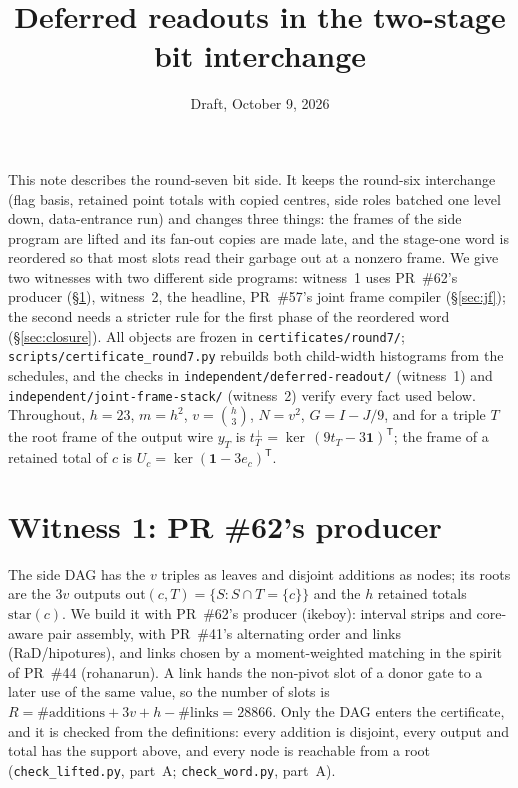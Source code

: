 \documentclass[11pt]{article}
\title{Deferred readouts in the two-stage bit interchange}
\date{Draft, October 9, 2026}
\theoremstyle{remark}\newtheorem*{remark}{Remark}
\begin{document}
\sloppy
\maketitle

This note describes the round-seven bit side. It keeps the round-six interchange (flag basis, retained point totals
with copied centres, side roles batched one level down, data-entrance run) and changes three things: the frames of
the side program are lifted and its fan-out copies are made late, and the stage-one word is reordered so that most
slots read their garbage out at a nonzero frame. We give two witnesses with two different side programs: witness~1
uses PR~\#62's producer (\S\ref{sec:pr62}), witness~2, the headline, PR~\#57's joint frame compiler
(\S\ref{sec:jf}); the second needs a stricter rule for the first phase of the reordered word (\S\ref{sec:closure}).
All objects are frozen in \texttt{certificates/round7/}; \texttt{scripts/certificate\_round7.py} rebuilds both
child-width histograms from the schedules, and the checks in \texttt{independent/deferred-readout/} (witness~1) and
\texttt{independent/joint-frame-stack/} (witness~2) verify every fact used below. Throughout, $h=23$,
$m=h^2$, $v=\binom h3$, $N=v^2$, $G=I-J/9$, and for a triple $T$ the root frame of the output wire $y_T$ is
$t_T^\perp=\ker\,(9t_T-3\mathbf 1)^{\mathsf T}$; the frame of a retained total of $c$ is $U_c=\ker(\mathbf 1-3e_c)^{\mathsf T}$.

\section{Witness 1: PR \#62's producer}\label{sec:pr62}
The side DAG has the $v$ triples as leaves and disjoint additions as nodes; its roots are the $3v$ outputs
$\mathrm{out}(c,T)=\{S: S\cap T=\{c\}\}$ and the $h$ retained totals $\mathrm{star}(c)$. We build it with PR~\#62's
producer (ikeboy): interval strips and core-aware pair assembly, with PR~\#41's alternating order and links
(RaD/hipotures), and links chosen by a moment-weighted matching in the spirit of PR~\#44 (rohanarun). A link hands the
non-pivot slot of a donor gate to a later use of the same value, so the number of slots is
$R=\#\text{additions}+3v+h-\#\text{links}=28866$. Only the DAG enters the certificate, and it is checked from the
definitions: every addition is disjoint, every output and total has the support above, and every node is reachable
from a root (\texttt{check\_lifted.py}, part~A; \texttt{check\_word.py}, part~A).
\end{document}
